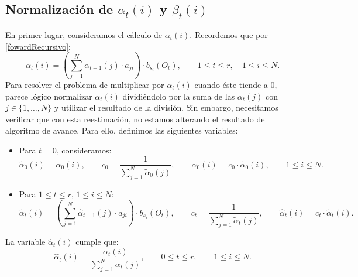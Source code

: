 \subsection{Normalización de $\alpha_t(i)$ y $\beta_t(i)$}
En primer lugar, consideramos el cálculo de $\alpha_t(i)$. Recordemos que por \eqref{fowardRecursivo}:
\[\alpha_{t}(i)=\left(\sum_{j=1}^N\alpha_{t-1}(j)\cdot a_{ji}\right)\cdot b_{s_i}(O_{t}), \qquad 1\leq t\leq r , \quad 1\leq i\leq N.\]
Para resolver el problema de multiplicar por $\alpha_t(i)$ cuando éste tiende a $0$, parece lógico normalizar $\alpha_t(i)$ dividiéndolo por la suma de las $\alpha_t(j)$ con $j\in\{1,\dots,N\}$ y utilizar el resultado de la división. Sin embargo, necesitamos verificar que con esta reestimación, no estamos alterando el resultado del algoritmo de avance. Para ello, definimos las siguientes variables:
\begin{itemize}
    \item Para $t=0$, consideramos:
        \begin{equation*}
            \tilde{\alpha}_0(i)=\alpha_0(i), \qquad c_0=\dfrac{1}{\displaystyle\sum_{j=1}^N\tilde{\alpha}_0(j)}, \qquad \hat{\alpha}_0(i)=c_0\cdot\tilde{\alpha}_0(i) ,\qquad 1\leq i\leq N.
        \end{equation*}
    \item Para $1\leq t\leq r$, $1\leq i\leq N$:
        \begin{equation*}
            \tilde{\alpha}_t(i)=\left(\sum_{j=1}^N \hat{\alpha}_{t-1}(j)\cdot a_{ji}\right)\cdot b_{s_i}(O_t), \qquad
            c_t=\dfrac{1}{\displaystyle\sum_{j=1}^N\tilde{\alpha}_t(j)}, \qquad
            \hat{\alpha}_t(i)=c_t\cdot\tilde{\alpha}_t(i).
        \end{equation*}
\end{itemize}
\begin{proposition} \label{fórmulaAlphaMejorada}
La variable $\hat{\alpha}_t(i)$ cumple que:
\[\hat{\alpha}_t(i)=\frac{\alpha_t(i)}{\displaystyle\sum_{j=1}^N \alpha_t(j)}, \qquad 0\leq t\leq r, \qquad 1\leq i\leq N.\]
\end{proposition}
